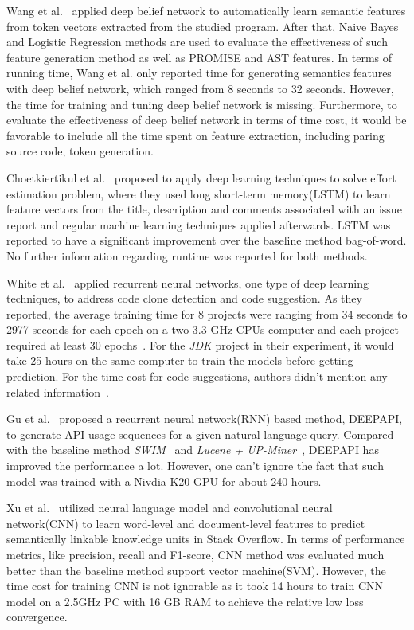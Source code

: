 \documentclass[sigconf,review, anonymous]{acmart}
\theoremstyle{break}
\begin{document}
 Wang et al.~\cite{wang2016automatically} applied deep belief network to automatically
 learn semantic features from token vectors extracted from the studied program. After
 that, Naive Bayes and Logistic Regression methods are used to evaluate the effectiveness
 of such feature generation method as well as PROMISE and AST features. In terms of
 running time, Wang et al. only reported time for generating semantics features with deep belief network, which
 ranged from 8 seconds to 32 seconds. However, the time for training and tuning deep belief network is
 missing. Furthermore, to evaluate the effectiveness of deep belief network in terms of time cost, 
 it would be favorable to include all the time spent on feature extraction, including
 paring source code, token generation.
 
 Choetkiertikul et al.~\cite{choetkiertikul2016deep} proposed to apply deep learning techniques
 to solve effort estimation problem, where they used long short-term memory(LSTM) to learn
 feature vectors from the title, description and comments associated with an issue report and
 regular machine learning techniques applied afterwards. LSTM was reported to have a 
 significant improvement over the baseline method bag-of-word. No further information regarding
 runtime was reported for both methods.
 
 White et al.~\cite{white2015toward, white2016deep} applied
 recurrent neural networks, one type of  deep learning techniques, 
 to address code clone detection and code suggestion. As they reported,
 the average training time for 8 projects were ranging from 34 seconds
  to 2977 seconds for each epoch on a two 3.3 GHz
 CPUs computer and each project required at least 30 epochs~\cite{white2016deep}.
 For the {\it JDK} project in their experiment, it would take 25 hours 
 on the same computer to train the models before getting prediction.
 For the time cost for code suggestions, authors didn't mention any related information~\cite{white2015toward}.

Gu et al.~\cite{gu2016deep} proposed  a recurrent neural network(RNN)
 based method, D{\scriptsize EEP}API, to generate API usage sequences for a given natural language query. 
 Compared with the baseline method {\it SWIM}~\cite{raghothaman2016swim} and 
 {\it Lucene + UP-Miner}~\cite{wang2013mining},  D{\scriptsize EEP}API has improved the performance a lot.
 However, one can't ignore the fact that such model was trained with a Nivdia K20 GPU for about 240 hours.
 
 Xu et al.~\cite{xu2016predicting} utilized neural language model and  
 convolutional neural network(CNN) to  learn word-level and document-level features to
 predict semantically linkable knowledge units in Stack Overflow. 
 In terms of performance metrics, like precision, recall and F1-score,
 CNN method was evaluated much better than 
 the baseline method support vector machine(SVM). 
 However, the time cost for training CNN is not ignorable as it took
 14 hours to train CNN model on a 2.5GHz PC with 16 GB RAM 
 to achieve the relative low loss convergence.
 
\end{document}
